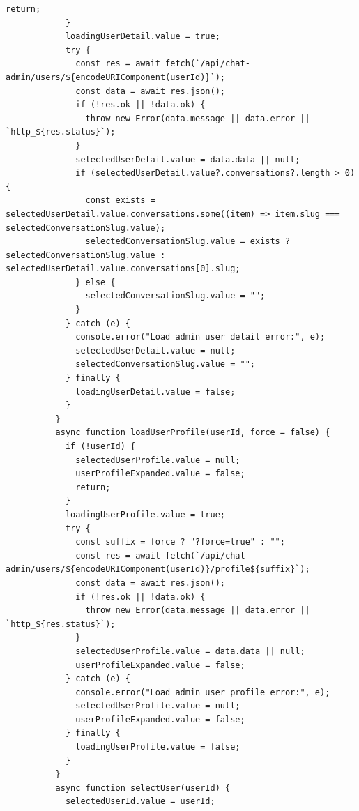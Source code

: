 \documentclass[12pt,a4paper]{article}
\begin{document}
\fancyhead[R]{}
\begin{Verbatim}[fontsize=\footnotesize]
              return;
            }
            loadingUserDetail.value = true;
            try {
              const res = await fetch(`/api/chat-admin/users/${encodeURIComponent(userId)}`);
              const data = await res.json();
              if (!res.ok || !data.ok) {
                throw new Error(data.message || data.error || `http_${res.status}`);
              }
              selectedUserDetail.value = data.data || null;
              if (selectedUserDetail.value?.conversations?.length > 0) {
                const exists = selectedUserDetail.value.conversations.some((item) => item.slug === selectedConversationSlug.value);
                selectedConversationSlug.value = exists ? selectedConversationSlug.value : selectedUserDetail.value.conversations[0].slug;
              } else {
                selectedConversationSlug.value = "";
              }
            } catch (e) {
              console.error("Load admin user detail error:", e);
              selectedUserDetail.value = null;
              selectedConversationSlug.value = "";
            } finally {
              loadingUserDetail.value = false;
            }
          }
          async function loadUserProfile(userId, force = false) {
            if (!userId) {
              selectedUserProfile.value = null;
              userProfileExpanded.value = false;
              return;
            }
            loadingUserProfile.value = true;
            try {
              const suffix = force ? "?force=true" : "";
              const res = await fetch(`/api/chat-admin/users/${encodeURIComponent(userId)}/profile${suffix}`);
              const data = await res.json();
              if (!res.ok || !data.ok) {
                throw new Error(data.message || data.error || `http_${res.status}`);
              }
              selectedUserProfile.value = data.data || null;
              userProfileExpanded.value = false;
            } catch (e) {
              console.error("Load admin user profile error:", e);
              selectedUserProfile.value = null;
              userProfileExpanded.value = false;
            } finally {
              loadingUserProfile.value = false;
            }
          }
          async function selectUser(userId) {
            selectedUserId.value = userId;
\end{Verbatim}
\newpage
{}
\fancyhead[R]{}
\end{document}

